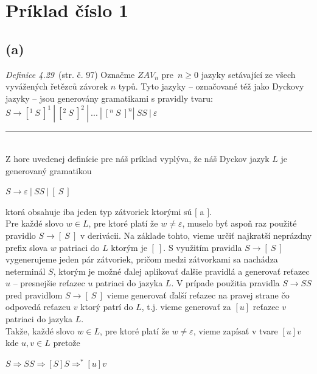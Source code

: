 \documentclass[11pt,a4paper]{article}
\begin{document}
\newpage
\section{Príklad číslo 1} %

\subsection{(a)}\label{sec:a}
\textit{Definice 4.29}~\cite{TIN}(str. č. 97) Označme $ZAV_n$ pre $n \geq 0$ jazyky setávající ze všech vyvážených řetězců závorek $n$ typů. Tyto jazyky -- označované též jako Dyckovy jazyky -- jsou generovány gramatikami s pravidly tvaru: $S \rightarrow [^{1}\ S\ ]^{1} \ |\  [^{2}\ S\ ]^{2} \ |\  ... \ |\  [^{n}\ S\ ]^{n} | \ SS \ | \ \varepsilon $

\rule{17cm}{0.4pt}

\hfill\\[-2em]

Z hore uvedenej definície pre náš príklad vyplýva, že náš Dyckov jazyk $L$ je generovaný gramatikou

\begin{center}
$S \rightarrow \varepsilon \ | \ SS \ | \ [\ S \ ]$
\end{center}

ktorá obsahuje iba jeden typ zátvoriek ktorými sú $[$ a $]$.\\

Pre každé slovo $w \in L$, pre ktoré platí že $w \neq \varepsilon$, muselo byť aspoň raz použité pravidlo $S \rightarrow [\ S \ ]$ v derivácii. Na základe tohto, vieme určiť najkratší neprázdny prefix slova $w$ patriaci do $L$ ktorým je $[\ ]$. S využitím pravidla $S \rightarrow [\ S \ ]$ vygenerujeme jeden pár zátvoriek, pričom medzi zátvorkami sa nachádza neterminál $S$, ktorým je možné ďalej aplikovať ďalšie pravidlá a generovať reťazec $u$ -- presnejšie reťazec $u$ patriaci do jazyka $L$. V prípade použitia pravidla $S \rightarrow SS$ pred pravidlom $S \rightarrow [\ S \ ]$ vieme generovať ďalší reťazec na pravej strane čo odpovedá reťazcu $v$ ktorý patrí do $L$, t.j. vieme generovať za $[u]$ reťazec $v$ patriaci do jazyka $L$.\\

Takže, každé slovo $w \in L$, pre ktoré platí že $w \neq \varepsilon$, vieme zapísať v tvare $[u]v$ kde $u,v \in L$ pretože

\begin{center}
$S \Rightarrow SS \Rightarrow [S]S \Rightarrow^{*} [u]v$
\end{center}
\end{document}
